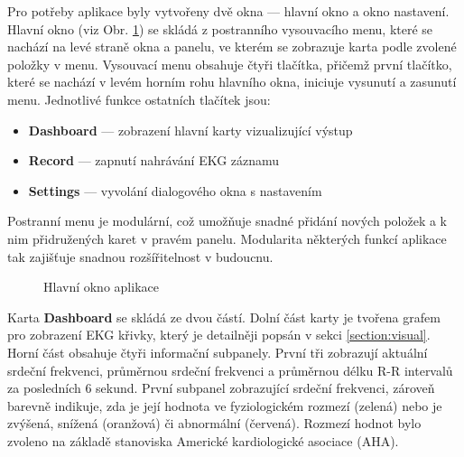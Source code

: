 Pro potřeby aplikace byly vytvořeny dvě okna --- hlavní okno a okno nastavení.
Hlavní okno (viz Obr. \ref{fig:app_main_window}) se skládá z postranního
vysouvacího menu, které se nachází na levé straně okna a panelu, ve kterém se
zobrazuje karta podle zvolené položky v menu. Vysouvací menu obsahuje čtyři
tlačítka, přičemž první tlačítko, které se nachází v levém horním rohu hlavního
okna, iniciuje vysunutí a zasunutí menu. Jednotlivé funkce ostatních tlačítek
jsou:
\begin{itemize}[noitemsep]
    \item \textbf{Dashboard} --- zobrazení hlavní karty vizualizující výstup
    \item \textbf{Record} --- zapnutí nahrávání EKG záznamu
    \item \textbf{Settings} --- vyvolání dialogového okna s nastavením
\end{itemize}
Postranní menu je modulární, což umožňuje snadné přidání nových položek a k nim
přidružených karet v pravém panelu. Modularita některých funkcí aplikace tak
zajišťuje snadnou rozšířitelnost v budoucnu.

\begin{figure}[h]
    \begin{center}
        \textcolor{cyan}{\fboxrule=0.5pt\fboxsep=0pt}
        \caption{Hlavní okno aplikace}
        \label{fig:app_main_window}
    \end{center}
\end{figure}

Karta \textbf{Dashboard} se skládá ze dvou částí. Dolní část karty je tvořena
grafem pro zobrazení EKG křivky, který je detailněji popsán v sekci
\ref{section:visual}. Horní část obsahuje čtyři informační subpanely. První tři
zobrazují aktuální srdeční frekvenci, průměrnou srdeční frekvenci a průměrnou
délku R-R intervalů za posledních 6 sekund. První subpanel zobrazující srdeční
frekvenci, zároveň barevně indikuje, zda je její hodnota ve fyziologickém
rozmezí (zelená) nebo je zvýšená, snížená (oranžová) či abnormální (červená).
Rozmezí hodnot bylo zvoleno na základě stanoviska Americké kardiologické
asociace (AHA).

